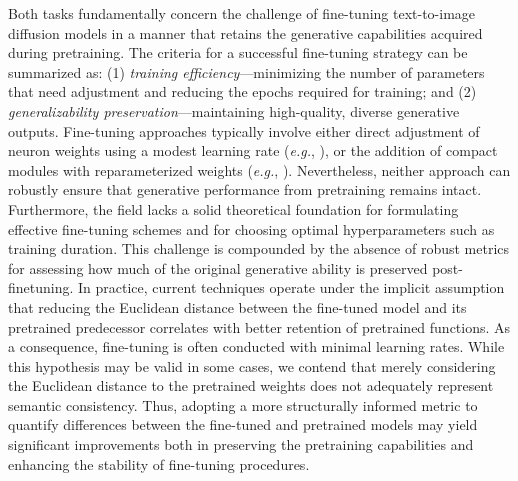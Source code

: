Both tasks fundamentally concern the challenge of fine-tuning text-to-image diffusion models in a manner that retains the generative capabilities acquired during pretraining. The criteria for a successful fine-tuning strategy can be summarized as: (1) \emph{training efficiency}—minimizing the number of parameters that need adjustment and reducing the epochs required for training; and (2) \emph{generalizability preservation}—maintaining high-quality, diverse generative outputs. Fine-tuning approaches typically involve either direct adjustment of neuron weights using a modest learning rate (\emph{e.g.}, \cite{ruiz2023dreambooth}), or the addition of compact modules with reparameterized weights (\emph{e.g.}, \cite{hulora2022,zhang2023adding}). Nevertheless, neither approach can robustly ensure that generative performance from pretraining remains intact. Furthermore, the field lacks a solid theoretical foundation for formulating effective fine-tuning schemes and for choosing optimal hyperparameters such as training duration. This challenge is compounded by the absence of robust metrics for assessing how much of the original generative ability is preserved post-finetuning. In practice, current techniques operate under the implicit assumption that reducing the Euclidean distance between the fine-tuned model and its pretrained predecessor correlates with better retention of pretrained functions. As a consequence, fine-tuning is often conducted with minimal learning rates. While this hypothesis may be valid in some cases, we contend that merely considering the Euclidean distance to the pretrained weights does not adequately represent semantic consistency. Thus, adopting a more structurally informed metric to quantify differences between the fine-tuned and pretrained models may yield significant improvements both in preserving the pretraining capabilities and enhancing the stability of fine-tuning procedures.

